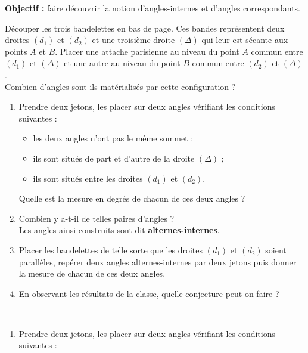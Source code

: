 \activites

\begin{activite}
   {\bf Objectif :} faire découvrir la notion d'angles-internes et d'angles correspondants.
   \begin{QCM}
   \partie[préparation]
      Découper les trois bandelettes en bas de page. Ces bandes représentent deux droites $(d_1)$ et $(d_2)$ et une troisième droite $(\Delta)$ qui leur est sécante aux points $A$ et $B$. Placer une attache parisienne au niveau du point $A$ commun entre $(d_1)$ et $(\Delta)$ et une autre au niveau du point $B$ commun entre $(d_2)$ et $(\Delta)$. \\
      Combien d'angles sont-ils matérialisés par cette configuration ? \pf \smallskip
   \ \\ [-11mm]
      \begin{enumerate}
         \item Prendre deux jetons, les placer sur deux angles vérifiant les conditions suivantes :
            \begin{itemize}
               \item les deux angles n'ont pas le même sommet ;
               \item ils sont situés de part et d'autre de la droite $(\Delta)$ ;
               \item ils sont situés \og entre \fg{} les droites $(d_1)$ et $(d_2)$.
            \end{itemize}
         Quelle est la mesure en degrés de chacun de ces deux angles ? \pf
         \item Combien y a-t-il de telles paires d'angles ? \pf \\
         Les angles ainsi construits sont dit {\bf alternes-internes}.
         \item Placer les bandelettes de telle sorte que les droites $(d_1)$ et $(d_2)$ soient parallèles, repérer deux angles alternes-internes par deux jetons puis donner la mesure de chacun de ces deux angles. \pf
         \item En observant les résultats de la classe, quelle conjecture peut-on faire ? \pf \\
         \pf \smallskip
      \end{enumerate}
    \ \\ [-11mm]
      \begin{enumerate}
         \item Prendre deux jetons, les placer sur deux angles vérifiant les conditions suivantes :

\end{enumerate}
\end{QCM}
\end{activite}
